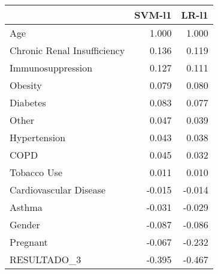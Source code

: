 \begin{tabular}{lrr}
\toprule
{} &  SVM-l1 &  LR-l1 \\
\midrule
Age                         &   1.000 &  1.000 \\
Chronic Renal Insufficiency &   0.136 &  0.119 \\
Immunosuppression           &   0.127 &  0.111 \\
Obesity                     &   0.079 &  0.080 \\
Diabetes                    &   0.083 &  0.077 \\
Other                       &   0.047 &  0.039 \\
Hypertension                &   0.043 &  0.038 \\
COPD                        &   0.045 &  0.032 \\
Tobacco Use                 &   0.011 &  0.010 \\
Cardiovascular Disease      &  -0.015 & -0.014 \\
Asthma                      &  -0.031 & -0.029 \\
Gender                      &  -0.087 & -0.086 \\
Pregnant                    &  -0.067 & -0.232 \\
RESULTADO\_3                 &  -0.395 & -0.467 \\
\bottomrule
\end{tabular}
